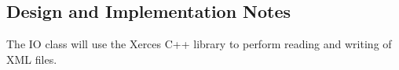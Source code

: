 
\subsection{Design and Implementation Notes}

The IO class will use the Xerces C++ library to perform reading and writing
of XML files.
